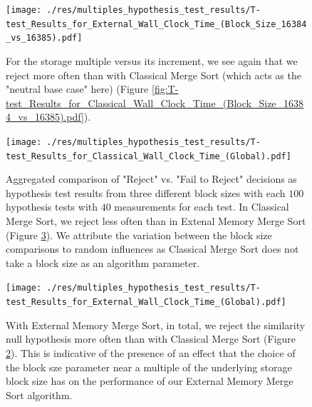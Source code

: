 \documentclass[twocolumn]{article}
\begin{document}
\begin{figure}[htb]
	\begin{minipage}{0.475 \textwidth}
	\centering
	\texttt{[image: ./res/multiples\_hypothesis\_test\_results/T-test\_Results\_for\_External\_Wall\_Clock\_Time\_(Block\_Size\_16384\_vs\_16385).pdf]}
	\caption{For the storage multiple versus its increment, we see again that we reject more often than with Classical Merge Sort (which acts as the "neutral base case" here) (Figure \ref{fig:T-test_Results_for_Classical_Wall_Clock_Time_(Block_Size_16384_vs_16385).pdf}).}
	\label{fig:T-test_Results_for_External_Wall_Clock_Time_(Block_Size_16384_vs_16385).pdf}
	\end{minipage}
\end{figure}

\begin{figure}[htb]
	\begin{minipage}{0.475 \textwidth}
	\centering
	\texttt{[image: ./res/multiples\_hypothesis\_test\_results/T-test\_Results\_for\_Classical\_Wall\_Clock\_Time\_(Global).pdf]}
	\caption{Aggregated comparison of "Reject" vs. "Fail to Reject" decisions as hypothesis test results from three different block sizes with each \( 100 \) hypothesis tests with \( 40 \) measurements for each test. In Classical Merge Sort, we reject less often than in Extenal Memory Merge Sort (Figure \ref{fig:T-test_Results_for_External_Wall_Clock_Time_(Global).pdf}).
	We attribute the variation between the block size comparisons to random influences as Classical Merge Sort does not take a block size as an algorithm parameter.}
	\label{fig:T-test_Results_for_Classical_Wall_Clock_Time_(Global).pdf}
	\end{minipage}
\end{figure}

\begin{figure}[htb]
	\begin{minipage}{0.475 \textwidth}
	\centering
	\texttt{[image: ./res/multiples\_hypothesis\_test\_results/T-test\_Results\_for\_External\_Wall\_Clock\_Time\_(Global).pdf]}
	\caption{With External Memory Merge Sort, in total, we reject the similarity null hypothesis more often than with Classical Merge Sort (Figure \ref{fig:T-test_Results_for_Classical_Wall_Clock_Time_(Global).pdf}). This is indicative of the presence of an effect that the choice of the block sze parameter 
	near a multiple of the underlying storage block size has on the performance of our External Memory Merge Sort algorithm.}
	\label{fig:T-test_Results_for_External_Wall_Clock_Time_(Global).pdf}
	\end{minipage}
\end{figure}
\end{document}
